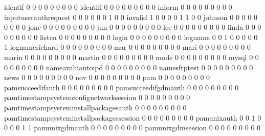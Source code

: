 \documentclass[compress,8pt]{beamer}
\begin{document}
\begin{frame}
\begin{Schunk}
  identif                                    0   0   0   0   0   0   0   0   0
  identifi                                   0   0   0   0   0   0   0   0   0
  inform                                     0   0   0   0   0   0   0   0   0
  inputuserauthrequest                       0   0   0   0   0   0   1   0   0
  invalid                                    1   0   0   0   0   1   1   0   0
  johnson                                    0   0   0   0   0   0   0   0   0
  jone                                       0   0   0   0   0   0   0   0   0
  jun                                        0   0   0   0   0   0   0   0   0
  lee                                        0   0   0   0   0   0   0   0   0
  linda                                      0   0   0   0   0   0   0   0   0
  listen                                     0   0   0   0   0   0   0   0   0
  login                                      0   0   0   0   0   0   0   0   0
  logname                                    0   0   1   0   0   0   0   0   1
  lognamerichard                             0   0   0   0   0   0   0   0   0
  mar                                        0   0   0   0   0   0   0   0   0
  mari                                       0   0   0   0   0   0   0   0   0
  marin                                      0   0   0   0   0   0   0   0   0
  martin                                     0   0   0   0   0   0   0   0   0
  mode                                       0   0   0   0   0   0   0   0   0
  mysql                                      0   0   0   0   0   0   0   0   0
  nameavahiautoipd                           0   0   0   0   0   0   0   0   0
  namesftptest                               0   0   0   0   0   0   0   0   0
  news                                       0   0   0   0   0   0   0   0   0
  nov                                        0   0   0   0   0   0   0   0   0
  pam                                        0   0   0   0   0   0   0   0   0
  pamsucceedifauth                           0   0   0   0   0   0   0   0   0
  pamsucceedifgdmauth                        0   0   0   0   0   0   0   0   0
  pamtimestampsystemconfignetworksession     0   0   0   0   0   0   0   0   0
  pamtimestampsysteminstallpackagesauth      0   0   0   0   0   0   0   0   0
  pamtimestampsysteminstallpackagessession   0   0   0   0   0   0   0   0   0
  pamunixauth                                0   0   1   0   0   0   0   1   1
  pamunixgdmauth                             0   0   0   0   0   0   0   0   0
  pamunixgdmsession                          0   0   0   0   0   0   0   0   0

\end{Schunk}
\end{frame}
\end{document}
